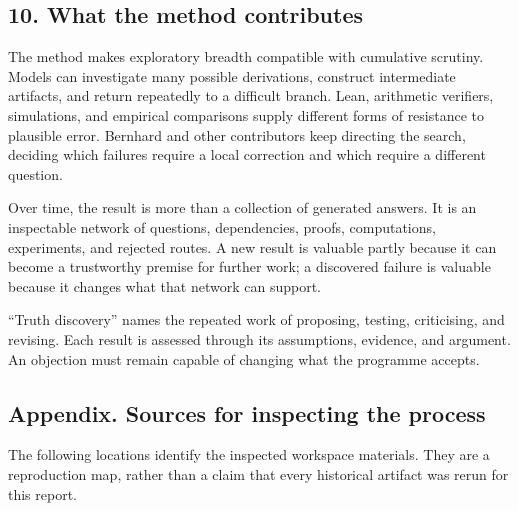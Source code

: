 \documentclass[
  11pt,
]{article}
\begin{document}
\subsection{10. What the method
contributes}\label{what-the-method-contributes}

The method makes exploratory breadth compatible with cumulative
scrutiny. Models can investigate many possible derivations, construct
intermediate artifacts, and return repeatedly to a difficult branch.
Lean, arithmetic verifiers, simulations, and empirical comparisons
supply different forms of resistance to plausible error. Bernhard and
other contributors keep directing the search, deciding which failures
require a local correction and which require a different question.

Over time, the result is more than a collection of generated answers. It
is an inspectable network of questions, dependencies, proofs,
computations, experiments, and rejected routes. A new result is valuable
partly because it can become a trustworthy premise for further work; a
discovered failure is valuable because it changes what that network can
support.

``Truth discovery'' names the repeated work of proposing, testing,
criticising, and revising. Each result is assessed through its
assumptions, evidence, and argument. An objection must remain capable of
changing what the programme accepts.

\newpage

\subsection{Appendix. Sources for inspecting the
process}\label{appendix.-sources-for-inspecting-the-process}

The following locations identify the inspected workspace materials. They
are a reproduction map, rather than a claim that every historical
artifact was rerun for this report.
\end{document}
